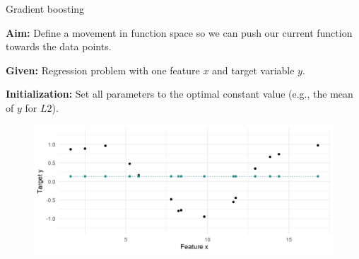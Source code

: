\begin{vbframe}{Gradient boosting}

\textbf{Aim:} Define a movement in function space so we can push our current function towards the data points.

\vspace*{0.1cm}
\textbf{Given:} Regression problem with one feature $x$ and target variable $y$.

\vspace*{0.1cm}
\textbf{Initialization:} Set all parameters to the optimal constant value (e.g., the mean of $y$ for $L2$).

\begin{figure}
  \includegraphics[width=\textwidth]{figure/fig-gb-concept-1.png}
\end{figure}



\end{vbframe}

